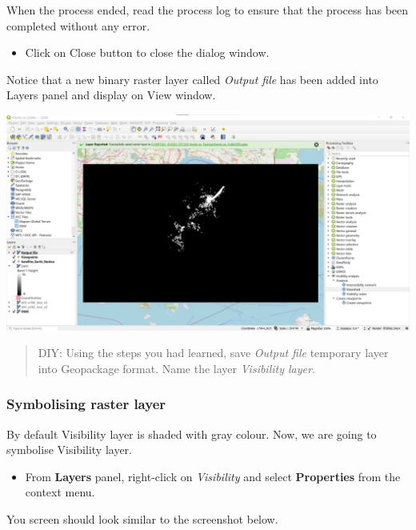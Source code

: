 \documentclass[
  letterpaper,
  DIV=11,
  numbers=noendperiod]{scrreprt}
\providecommand{\tightlist}{%
  \setlength{\itemsep}{0pt}\setlength{\parskip}{0pt}}\usepackage{longtable,booktabs,array}
\begin{document}
When the process ended, read the process log to ensure that the process
has been completed without any error.

\begin{itemize}
\tightlist
\item
  Click on Close button to close the dialog window.
\end{itemize}

Notice that a new binary raster layer called \emph{Output file} has been
added into Layers panel and display on View window.

\includegraphics{./img06/image65.jpg}

\begin{quote}
DIY: Using the steps you had learned, save \emph{Output file} temporary
layer into Geopackage format. Name the layer \emph{Visibility layer}.
\end{quote}

\hypertarget{symbolising-raster-layer}{%
\subsubsection{Symbolising raster
layer}\label{symbolising-raster-layer}}

By default Visibility layer is shaded with gray colour. Now, we are
going to symbolise Visibility layer.

\begin{itemize}
\tightlist
\item
  From \textbf{Layers} panel, right-click on \emph{Visibility} and
  select \textbf{Properties} from the context menu.
\end{itemize}

You screen should look similar to the screenshot below.
\end{document}
